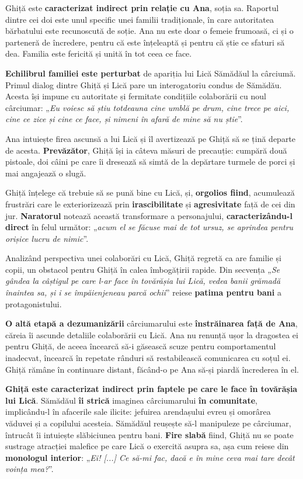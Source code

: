 \documentclass{article}
\newcommand{\qu}[1]{„\emph{#1}”}
\begin{document}
Ghiță este \textbf{caracterizat indirect prin relație cu Ana}, soția sa. Raportul dintre cei doi este unul specific unei familii tradiționale, în care autoritatea bărbatului este recunoscută de soție. Ana nu este doar o femeie frumoasă, ci și o parteneră de încredere, pentru că este înțeleaptă și pentru că știe ce sfaturi să dea. Familia este fericită și unită în tot ceea ce face.

\textbf{Echilibrul familiei este perturbat} de apariția lui Lică Sămădăul la cârciumă. Primul dialog dintre Ghiță și Lică pare un interogatoriu condus de Sămădău. Acesta își impune cu autoritate și fermitate condițiile colaborării cu noul cârciumar: \qu{Eu voiesc să știu totdeauna cine umblă pe drum, cine trece pe aici, cine ce zice și cine ce face, și nimeni în afară de mine să nu știe}.

Ana intuiește firea ascunsă a lui Lică și îl avertizează pe Ghiță să se țină departe de acesta. \textbf{Prevă\-zător}, Ghiță își ia câteva măsuri de precauție: cumpără două pistoale, doi câini pe care îi dresează să simtă de la depărtare turmele de porci și mai angajează o slugă.

Ghiță înțelege că trebuie să se pună bine cu Lică, și, \textbf{orgolios fiind}, acumulează frustrări care le exteriorizează prin \textbf{irascibilitate} și \textbf{agresivitate} față de cei din jur. \textbf{Naratorul} notează această transformare a personajului, \textbf{caracterizându-l direct} în felul următor: \qu{acum el se făcuse mai de tot ursuz, se aprindea pentru orișice lucru de nimic}.

Analizând perspectiva unei colaborări cu Lică, Ghiță regretă ca are familie și copii, un obstacol pentru Ghiță în calea îmbogățirii rapide. Din secvența \qu{Se gândea la câștigul pe care l-ar face în tovărășia lui Lică, vedea banii grămadă înaintea sa, și i se împăienjeneau parcă ochii} reiese \textbf{patima pentru bani} a protagonistului.

\textbf{O altă etapă a dezumanizării} cârciumarului este \textbf{înstrăinarea față de Ana}, căreia îi ascunde detaliile colaborării cu Lică. Ana nu renunță ușor la dragostea ei pentru Ghiță, de aceea încearcă să-i găsească scuze pentru comportamentul inadecvat, încearcă în repetate rânduri să restabilească comunicarea cu soțul ei. Ghiță rămâne în continuare distant, făcând-o pe Ana să-și piardă încrederea în el.

\textbf{Ghiță este caracterizat indirect prin faptele pe care le face în tovărășia lui Lică}. Sămădăul \textbf{îi strică} imaginea cârciumarului \textbf{în comunitate}, implicându-l în afacerile sale ilicite: jefuirea arendașului evreu și omorârea văduvei și a copilului acesteia. Sămădăul reușește să-l manipuleze pe cârciumar, întrucât îi intuiește slăbiciunea pentru bani. \textbf{Fire slabă} fiind, Ghiță nu se poate sustrage atracției malefice pe care Lică o exercită asupra sa, așa cum reiese din \textbf{monologul interior}: \qu{Ei! [...] Ce să-mi fac, dacă e în mine ceva mai tare decât voința mea?}.
\end{document}
